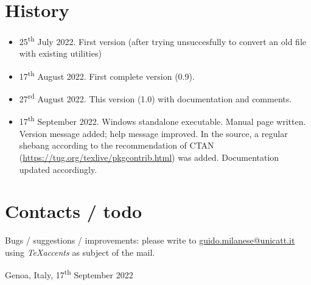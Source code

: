 \documentclass[
  12pt,
  english,
]{article}
\providecommand{\tightlist}{%
  \setlength{\itemsep}{0pt}\setlength{\parskip}{0pt}}
\begin{document}
\hypertarget{history}{%
\section{History}\label{history}}

\begin{itemize}
\tightlist
\item
  25\textsuperscript{th} July 2022. First version (after trying
  unsuccesfully to convert an old file with existing utilities)
\item
  17\textsuperscript{th} August 2022. First complete version (0.9).
\item
  27\textsuperscript{rd} August 2022. This version (1.0) with
  documentation and comments.
\item
  17\textsuperscript{th} September 2022. Windows standalone executable.
  Manual page written. Version message added; help message improved. In
  the source, a regular shebang according to the recommendation of CTAN
  (\url{https://tug.org/texlive/pkgcontrib.html}) was added.
  Documentation updated accordingly.
\end{itemize}

\hypertarget{contacts-todo}{%
\section{Contacts / todo}\label{contacts-todo}}

Bugs / suggestions / improvements: please write to
\url{guido.milanese@unicatt.it} using \emph{TeXaccents} as subject of
the mail.

Genoa, Italy, 17\textsuperscript{th} September 2022
\end{document}
